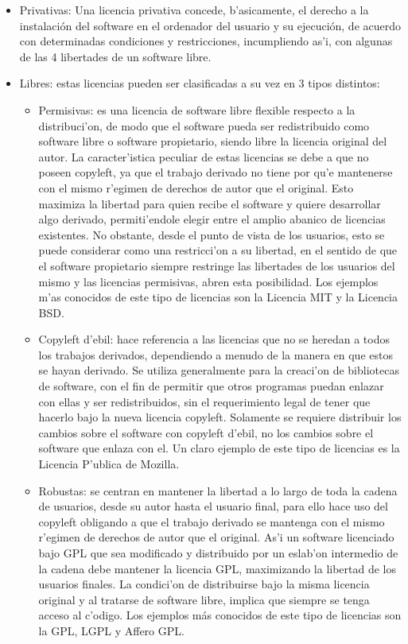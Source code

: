 \begin{itemize}
\item Privativas:  Una licencia privativa concede, b'asicamente, el derecho a la instalación del software en el ordenador del usuario y su ejecución, de acuerdo con determinadas condiciones y restricciones, incumpliendo as'i, con algunas de las 4 libertades de un software libre.
\item Libres: estas licencias pueden ser clasificadas a su vez en 3 tipos distintos:
\begin{itemize}
\item Permisivas: es una licencia de software libre flexible respecto a la distribuci'on, de modo que el software pueda ser redistribuido como software libre o software propietario, siendo libre la licencia original del autor.
La caracter'istica peculiar de estas licencias se debe a que no poseen copyleft, ya que el trabajo derivado no tiene por qu'e mantenerse con el mismo r'egimen de derechos de autor que el original. Esto maximiza la libertad para quien recibe el software y quiere desarrollar algo derivado, permiti'endole elegir entre el amplio abanico de licencias existentes. No obstante, desde el punto de vista de los usuarios, esto se puede considerar como una restricci'on a su libertad, en el sentido de que el software propietario siempre restringe las libertades de los usuarios del mismo y las licencias permisivas, abren esta posibilidad. Los ejemplos m'as conocidos de este tipo de licencias son la Licencia MIT y la Licencia BSD.
\item Copyleft d'ebil: hace referencia a las licencias que no se heredan a todos los trabajos derivados, dependiendo a menudo de la manera en que estos se hayan derivado. Se utiliza generalmente para la creaci'on de bibliotecas de software, con el fin de permitir que otros programas puedan enlazar con ellas y ser redistribuidos, sin el requerimiento legal de tener que hacerlo bajo la nueva licencia copyleft. Solamente se requiere distribuir los cambios sobre el software con copyleft d'ebil, no los cambios sobre el software que enlaza con el. Un claro ejemplo de este tipo de licencias es la Licencia P'ublica de Mozilla.
\item Robustas: se centran en mantener la libertad a lo largo de toda la cadena de usuarios, desde su autor hasta el usuario final, para ello hace uso del copyleft obligando a que el trabajo derivado se mantenga con el mismo r'egimen de derechos de autor que el original. As'i un software licenciado bajo GPL que sea modificado y distribuido por un eslab'on intermedio de la cadena debe mantener la licencia GPL, maximizando la libertad de los usuarios finales.
La condici'on de distribuirse bajo la misma licencia original y al tratarse de software libre, implica que siempre se tenga acceso al c'odigo.
Los ejemplos más conocidos de este tipo de licencias son la GPL, LGPL y Affero GPL.
\end{itemize}
\end{itemize}
\newpage
